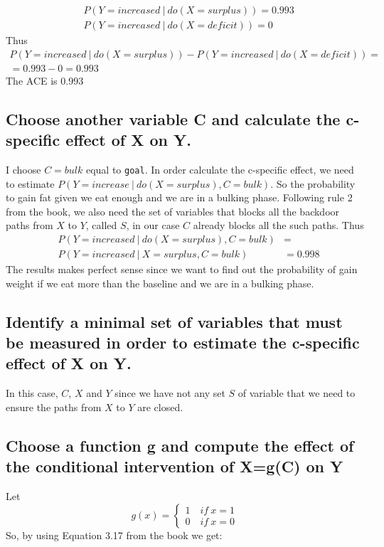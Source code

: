 \documentclass[11pt]{article}
\newcommand\given[1][]{\:#1\vert\:}
\begin{document}
\begin{align}
&P(Y=increased \given do(X=surplus)) = 0.993 \\
&P(Y=increased\given do(X=deficit)) = 0
\end{align}
Thus
\begin{align*}
P(Y=increased \given do(X=surplus)) - P(Y=increased\given do(X=deficit)) = \\
=  0.993 - 0 = 0.993
\end{align*}
The ACE is $0.993$
\subsection{Choose another variable C and calculate the c-specific effect of X on Y.}
I choose $C=bulk$ equal to \texttt{goal}. In order calculate the c-specific effect, we need to estimate $P(Y=increase \given do(X=surplus), C=bulk)$. So the probability to gain fat given we eat enough and we are in a bulking phase. Following rule 2 from the book, we also need the set of variables that blocks all the backdoor paths from $X$ to $Y$, called $S$, in our case $C$ already blocks all the such paths. Thus
\begin{align*}
&P(Y=increased \given do(X=surplus), C=bulk) &= \\
& P(Y=increased \given X=surplus, C=bulk) &= 0.998
\end{align*}
The results makes perfect sense since we want to find out the probability of gain weight if we eat more than the baseline and we are in a bulking phase.

\subsection{Identify a minimal set of variables that must be measured in order to estimate the c-specific effect of X on Y.}
In this case, $C$, $X$ and $Y$ since we have not any set $S$ of variable that we need to ensure the paths from $X$ to $Y$ are closed.

\subsection{Choose a function g and compute the effect of the conditional intervention of X=g(C) on Y}
Let 
\begin{equation}
g(x) = 
\begin{cases} 
1 \quad if \ x = 1 \\
0 \quad if \ x =  0 
\end{cases}
\end{equation}
So, by using Equation 3.17 from the book we get:
\end{document}
